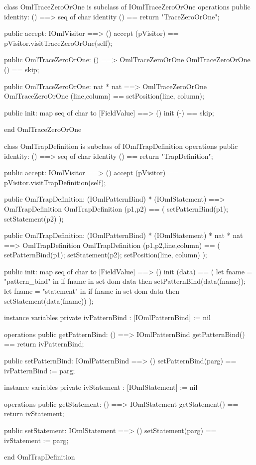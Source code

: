 \begin{vdm_al}
class OmlTraceZeroOrOne is subclass of IOmlTraceZeroOrOne
operations
  public identity: () ==> seq of char
  identity () == return "TraceZeroOrOne";

  public accept: IOmlVisitor ==> ()
  accept (pVisitor) == pVisitor.visitTraceZeroOrOne(self);

  public OmlTraceZeroOrOne:
    () ==> OmlTraceZeroOrOne
  OmlTraceZeroOrOne () == 
    skip;

  public OmlTraceZeroOrOne:
    nat *
    nat ==> OmlTraceZeroOrOne
  OmlTraceZeroOrOne (line,column) == 
    setPosition(line, column);

  public init: map seq of char to [FieldValue] ==> ()
  init (-) == skip;

end OmlTraceZeroOrOne
\end{vdm_al}

\begin{vdm_al}
class OmlTrapDefinition is subclass of IOmlTrapDefinition
operations
  public identity: () ==> seq of char
  identity () == return "TrapDefinition";

  public accept: IOmlVisitor ==> ()
  accept (pVisitor) == pVisitor.visitTrapDefinition(self);

  public OmlTrapDefinition:
    (IOmlPatternBind) *
    (IOmlStatement) ==> OmlTrapDefinition
  OmlTrapDefinition (p1,p2) == 
    ( setPatternBind(p1);
      setStatement(p2) );

  public OmlTrapDefinition:
    (IOmlPatternBind) *
    (IOmlStatement) *
    nat *
    nat ==> OmlTrapDefinition
  OmlTrapDefinition (p1,p2,line,column) == 
    ( setPatternBind(p1);
      setStatement(p2);
      setPosition(line, column) );

  public init: map seq of char to [FieldValue] ==> ()
  init (data) ==
    ( let fname = "pattern_bind" in
        if fname in set dom data
        then setPatternBind(data(fname));
      let fname = "statement" in
        if fname in set dom data
        then setStatement(data(fname)) );

instance variables
  private ivPatternBind : [IOmlPatternBind] := nil

operations
  public getPatternBind: () ==> IOmlPatternBind
  getPatternBind() == return ivPatternBind;

  public setPatternBind: IOmlPatternBind ==> ()
  setPatternBind(parg) == ivPatternBind := parg;

instance variables
  private ivStatement : [IOmlStatement] := nil

operations
  public getStatement: () ==> IOmlStatement
  getStatement() == return ivStatement;

  public setStatement: IOmlStatement ==> ()
  setStatement(parg) == ivStatement := parg;

end OmlTrapDefinition
\end{vdm_al}

